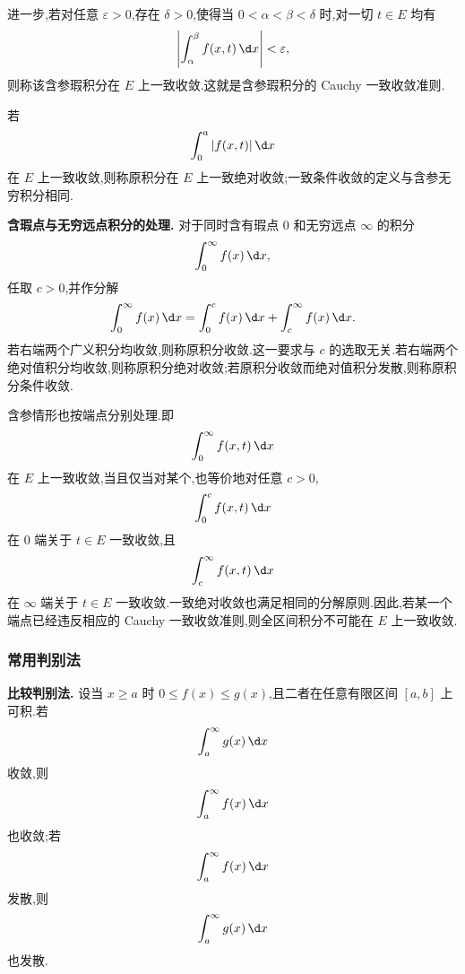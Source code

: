 进一步,若对任意 $\varepsilon>0$,存在 $\delta>0$,使得当 $0<\alpha<\beta<\delta$ 时,对一切 $t\in E$ 均有
\begin{equation*}
	\left|\int_\alpha^\beta f(x,t)\,\d x\right|<\varepsilon,
\end{equation*}
则称该含参瑕积分在 $E$ 上一致收敛.这就是含参瑕积分的 Cauchy 一致收敛准则.

若
\begin{equation*}
	\int_0^a |f(x,t)|\,\d x
\end{equation*}
在 $E$ 上一致收敛,则称原积分在 $E$ 上一致绝对收敛;一致条件收敛的定义与含参无穷积分相同.

\textbf{含瑕点与无穷远点积分的处理.}
对于同时含有瑕点 $0$ 和无穷远点 $\infty$ 的积分
\begin{equation*}
	\int_0^\infty f(x)\,\d x,
\end{equation*}
任取 $c>0$,并作分解
\begin{equation*}
	\int_0^\infty f(x)\,\d x
	=
	\int_0^c f(x)\,\d x+
	\int_c^\infty f(x)\,\d x.
\end{equation*}
若右端两个广义积分均收敛,则称原积分收敛.这一要求与 $c$ 的选取无关.若右端两个绝对值积分均收敛,则称原积分绝对收敛;若原积分收敛而绝对值积分发散,则称原积分条件收敛.

含参情形也按端点分别处理.即
\begin{equation*}
	\int_0^\infty f(x,t)\,\d x
\end{equation*}
在 $E$ 上一致收敛,当且仅当对某个,也等价地对任意 $c>0$,
\begin{equation*}
	\int_0^c f(x,t)\,\d x
\end{equation*}
在 $0$ 端关于 $t\in E$ 一致收敛,且
\begin{equation*}
	\int_c^\infty f(x,t)\,\d x
\end{equation*}
在 $\infty$ 端关于 $t\in E$ 一致收敛.一致绝对收敛也满足相同的分解原则.因此,若某一个端点已经违反相应的 Cauchy 一致收敛准则,则全区间积分不可能在 $E$ 上一致收敛.

\subsubsection{常用判别法}

\textbf{比较判别法.}
设当 $x\geq a$ 时 $0\leq f(x)\leq g(x)$,且二者在任意有限区间 $[a,b]$ 上可积.若
\begin{equation*}
	\int_a^\infty g(x)\,\d x
\end{equation*}
收敛,则
\begin{equation*}
	\int_a^\infty f(x)\,\d x
\end{equation*}
也收敛;若
\begin{equation*}
	\int_a^\infty f(x)\,\d x
\end{equation*}
发散,则
\begin{equation*}
	\int_a^\infty g(x)\,\d x
\end{equation*}
也发散.

